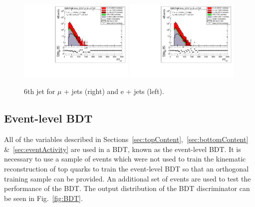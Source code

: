 \begin{figure}[!ht]
    \includegraphics[width=0.49\textwidth]{images/Run1/6thJetPt_StackLogY_Mu.pdf}
    \includegraphics[width=0.49\textwidth]{images/Run1/6thJetPt_StackLogY_e.pdf}
    \caption{6th jet \pt for $\mu$ + jets (right) and e + jets (left).}
    \label{fig:6thjetpt}
\end{figure}

\subsection{Event-level BDT}
All of the variables described in Sections~\ref{sec:topContent},~\ref{sec:bottomContent} \&~\ref{sec:eventActivity} are used in a BDT, known as the event-level BDT. It is necessary to use a sample of events which were not used to train the kinematic reconstruction of top quarks to train the event-level BDT so that an orthogonal training sample can be provided. An additional set of events are used to test the performance of the BDT. The output distribution of the BDT discriminator can be seen in Fig.~\ref{fig:BDT}.

